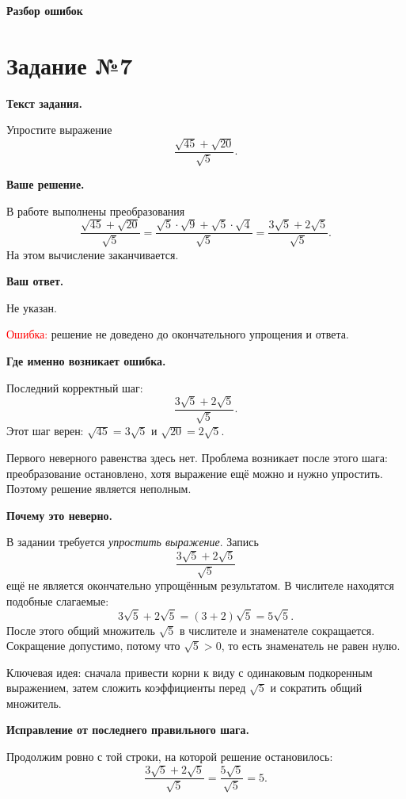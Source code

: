 \documentclass[12pt,a4paper]{article}
\begin{document}
\normalsize

\newpage
\null
\vfill
\begin{center}
{\LARGE\bfseries Разбор ошибок}
\end{center}
\vfill
\null

\newpage
{}
\label{task:7}
\section*{Задание №7}

\textbf{Текст задания.}

Упростите выражение
\[
\frac{\sqrt{45}+\sqrt{20}}{\sqrt5}.
\]

\textbf{Ваше решение.}

В работе выполнены преобразования
\[
\frac{\sqrt{45}+\sqrt{20}}{\sqrt5}
=
\frac{\sqrt5\cdot\sqrt9+\sqrt5\cdot\sqrt4}{\sqrt5}
=
\frac{3\sqrt5+2\sqrt5}{\sqrt5}.
\]
На этом вычисление заканчивается.

\textbf{Ваш ответ.}

Не указан.

\textcolor{red}{Ошибка:} решение не доведено до окончательного упрощения и ответа.

\textbf{Где именно возникает ошибка.}

Последний корректный шаг:
\[
\frac{3\sqrt5+2\sqrt5}{\sqrt5}.
\]
Этот шаг верен: $\sqrt{45}=3\sqrt5$ и $\sqrt{20}=2\sqrt5$.

Первого неверного равенства здесь нет. Проблема возникает после этого шага: преобразование остановлено, хотя выражение ещё можно и нужно упростить. Поэтому решение является неполным.

\textbf{Почему это неверно.}

В задании требуется \emph{упростить выражение}. Запись
\[
\frac{3\sqrt5+2\sqrt5}{\sqrt5}
\]
ещё не является окончательно упрощённым результатом. В числителе находятся подобные слагаемые:
\[
3\sqrt5+2\sqrt5=(3+2)\sqrt5=5\sqrt5.
\]
После этого общий множитель $\sqrt5$ в числителе и знаменателе сокращается. Сокращение допустимо, потому что $\sqrt5>0$, то есть знаменатель не равен нулю.

\textcolor{blue!60!black}{Ключевая идея:} сначала привести корни к виду с одинаковым подкоренным выражением, затем сложить коэффициенты перед $\sqrt5$ и сократить общий множитель.

\textbf{Исправление от последнего правильного шага.}

Продолжим ровно с той строки, на которой решение остановилось:
\[
\frac{3\sqrt5+2\sqrt5}{\sqrt5}
=
\frac{5\sqrt5}{\sqrt5}
=
5.
\]
\end{document}
